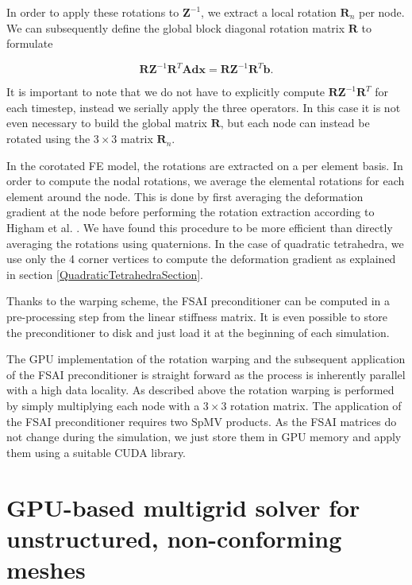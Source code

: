 In order to apply these rotations to $\mathbf{Z}^{-1}$, we extract a local rotation $\mathbf{R}_n$ per node. We can subsequently define the global block diagonal rotation matrix $\mathbf{R}$ to formulate

\begin{equation}
\mathbf{R} \mathbf{Z}^{-1} \mathbf{R}^T \mathbf{A} \mathbf{dx} = \mathbf{R} \mathbf{Z}^{-1} \mathbf{R}^T \mathbf{b}.
\end{equation}

It is important to note that we do not have to explicitly compute $\mathbf{R} \mathbf{Z}^{-1} \mathbf{R}^T$ for each timestep, instead we serially apply the three operators. In this case it is not even necessary to build the global matrix $\mathbf{R}$, but each node can instead be rotated using the $3\times3$ matrix $\mathbf{R}_n$.

In the corotated FE model, the rotations are extracted on a per element basis. In order to compute the nodal rotations, we average the elemental rotations for each element around the node. This is done by first averaging the deformation gradient at the node before performing the rotation extraction according to Higham et al. \cite{Higham1988}. We have found this procedure to be more efficient than directly averaging the rotations using quaternions. In the case of quadratic tetrahedra, we use only the 4 corner vertices to compute the deformation gradient as explained in section \ref{QuadraticTetrahedraSection}.

Thanks to the warping scheme, the FSAI preconditioner can be computed in a pre-processing step from the linear stiffness matrix. It is even possible to store the preconditioner to disk and just load it at the beginning of each simulation.

The GPU implementation of the rotation warping and the subsequent application of the FSAI preconditioner is straight forward as the process is inherently parallel with a high data locality. As described above the rotation warping is performed by simply multiplying each node with a $3\times3$ rotation matrix. The application of the FSAI preconditioner requires two SpMV products. As the FSAI matrices do not change during the simulation, we just store them in GPU memory and apply them using a suitable CUDA library. 


\section{GPU-based multigrid solver for unstructured, non-conforming meshes}

